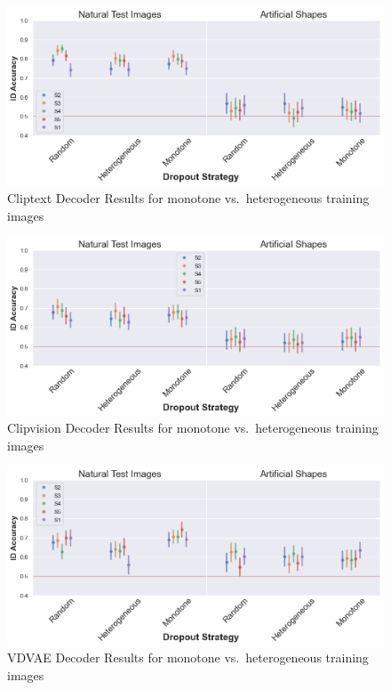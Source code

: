 \begin{figure}[ht]
   \centering
   \includegraphics[width=1\textwidth]{plots/dropout_discussion_translator_id_acc_cliptext.png}
   \caption{Cliptext Decoder Results for monotone vs.\ heterogeneous training images}\label{fig:dropout_discussion_translator_id_acc_cliptext}
 \end{figure}
 
 \begin{figure}[ht]
   \centering
   \includegraphics[width=1\textwidth]{plots/dropout_discussion_translator_id_acc_clipvision.png}
   \caption{Clipvision Decoder Results for monotone vs.\ heterogeneous training images}\label{fig:dropout_discussion_translator_id_acc_clipvision}
 \end{figure}
 
 \begin{figure}[ht]
   \centering
   \includegraphics[width=1\textwidth]{plots/dropout_discussion_translator_id_acc_vdvae.png}
   \caption{VDVAE Decoder Results for monotone vs.\ heterogeneous training images}\label{fig:dropout_discussion_translator_id_acc_vdvae}
 \end{figure}
 
